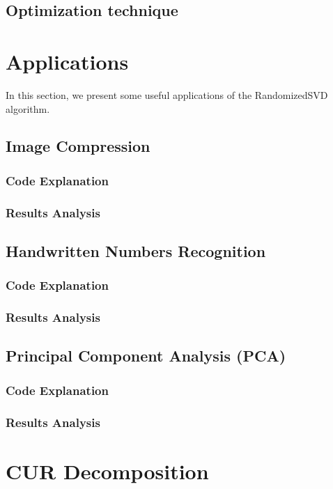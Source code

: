 \documentclass[11pt,a4paper]{article}
\begin{document}
\subsection{Optimization technique}

\section{Applications}
In this section, we present some useful applications of the RandomizedSVD algorithm.
\subsection{Image Compression}
\subsubsection{Code Explanation}
\subsubsection{Results Analysis}



\subsection{Handwritten Numbers Recognition}
\subsubsection{Code Explanation}
\subsubsection{Results Analysis}


\subsection{Principal Component Analysis (PCA)}
\subsubsection{Code Explanation}
\subsubsection{Results Analysis}


\section{CUR Decomposition}
\end{document}
